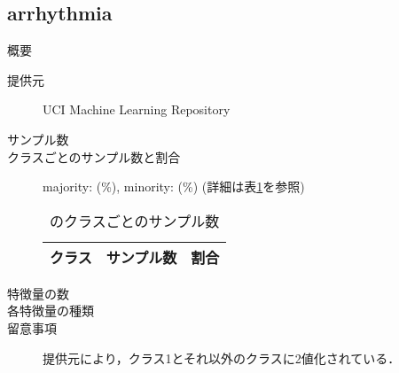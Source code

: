 \subsection{arrhythmia}
\begin{description}
    \item[概要] \cite{}
    \item[提供元] UCI Machine Learning Repository
    \item[サンプル数] 
    \item[クラスごとのサンプル数と割合] majority:  (\%), minority:  (\%) (詳細は表\ref{tab:}を参照)

        \begin{table}[htbp]
            \centering
            \caption{のクラスごとのサンプル数}
            \label{tab:}
            \begin{tabular}{lrc} \hline
                \multicolumn{1}{c}{クラス}&
                \multicolumn{1}{c}{サンプル数}&
                \multicolumn{1}{c}{割合}\\
                \hline
                \hline

                \hline
            \end{tabular}
        \end{table}

    \item[特徴量の数] 
    \item[各特徴量の種類] \mbox{}
        
    \item[留意事項] 提供元により，クラス1とそれ以外のクラスに2値化されている．
\end{description}

